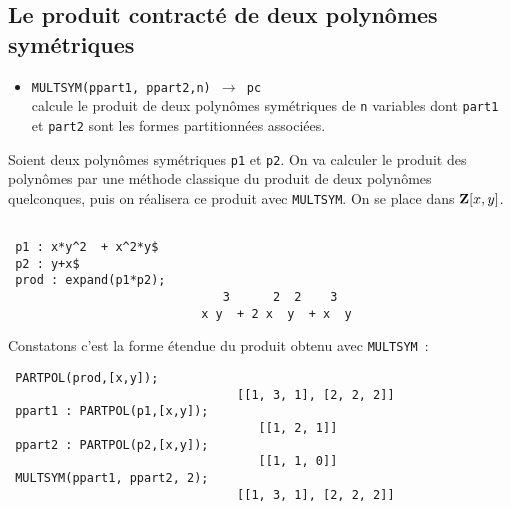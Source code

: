 \documentclass[11pt]{article}
\begin{document}
\subsection{Le produit contract\'e de deux polyn\^omes sym\'etriques}
\begin{itemize}
\item{\tt MULTSYM(ppart1, ppart2,n)
  $\longrightarrow$ pc} \\
calcule le produit de deux polyn\^omes
sym\'etriques de {\tt n} variables dont {\tt part1} et {\tt part2} sont les
formes partitionn\'ees associ\'ees.

\end{itemize}
Soient deux polyn\^omes sym\'etriques {\tt p1} et {\tt p2}. On va
calculer le produit des polyn\^omes par une m\'ethode classique du 
produit de deux polyn\^omes quelconques, puis on r\'ealisera
ce produit avec {\tt MULTSYM}. On se place dans ${\bf Z}[x,y]$.
\small
\begin{verbatim}
 
 p1 : x*y^2  + x^2*y$
 p2 : y+x$
 prod : expand(p1*p2);
                              3      2  2    3
                           x y  + 2 x  y  + x  y
\end{verbatim}
\normalsize
Constatons c'est la forme \'etendue du produit obtenu avec {\tt MULTSYM}~:
\small
\begin{verbatim}
 PARTPOL(prod,[x,y]);
                                [[1, 3, 1], [2, 2, 2]]
 ppart1 : PARTPOL(p1,[x,y]);
                                   [[1, 2, 1]]
 ppart2 : PARTPOL(p2,[x,y]);
                                   [[1, 1, 0]]
 MULTSYM(ppart1, ppart2, 2);
                                [[1, 3, 1], [2, 2, 2]]
\end{verbatim}
\normalsize
\end{document}
